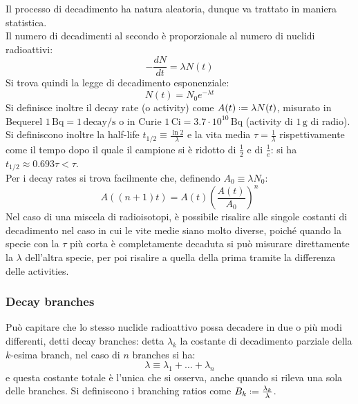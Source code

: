 Il processo di decadimento ha natura aleatoria, dunque va trattato in maniera statistica.\\
Il numero di decadimenti al secondo è proporzionale al numero di nuclidi radioattivi:
\begin{equation}
	- \frac{dN}{dt} = \lambda N(t)
	\label{eq:2.1}
\end{equation}
Si trova quindi la legge di decadimento esponenziale:
\begin{equation}
	N(t) = N_0 e^{-\lambda t}
	\label{eq:2.2}
\end{equation}
Si definisce inoltre il decay rate (o activity) come $ A(t) \defeq \lambda N(t) $, misurato in Bequerel $ 1\,\text{Bq} = 1 \,\text{decay}/\text{s} $ o in Curie $ 1\,\text{Ci} = 3.7\cdot10^{10}\,\text{Bq} $ (activity di $ 1\,\text{g} $ di radio). Si definiscono inoltre la half-life $ t_{1/2} \equiv \frac{\ln 2}{\lambda} $ e la vita media $ \tau = \frac{1}{\lambda} $ rispettivamente come il tempo dopo il quale il campione si è ridotto di $ \frac{1}{2} $ e di $ \frac{1}{e} $: si ha $ t_{1/2} \approx 0.693 \tau < \tau $.\\
Per i decay rates si trova facilmente che, definendo $ A_0 \equiv \lambda N_0 $:
\begin{equation}
	A((n+1)t) = A(t) \left( \frac{A(t)}{A_0} \right)^n
	\label{eq:2.3}
\end{equation}
Nel caso di una miscela di radioisotopi, è possibile risalire alle singole costanti di decadimento nel caso in cui le vite medie siano molto diverse, poiché quando la specie con la $ \tau $ più corta è completamente decaduta si può misurare direttamente la $ \lambda $ dell'altra specie, per poi risalire a quella della prima tramite la differenza delle activities.

\subsubsection{Decay branches}

Può capitare che lo stesso nuclide radioattivo possa decadere in due o più modi differenti, detti decay branches: detta $ \lambda_k $ la costante di decadimento parziale della $ k $-esima branch, nel caso di $ n $ branches si ha:
\begin{equation}
	\lambda \equiv \lambda_1 + \dots + \lambda_n
	\label{eq:2.4}
\end{equation}
e questa costante totale è l'unica che si osserva, anche quando si rileva una sola delle branches. Si definiscono i branching ratios come $ B_k \defeq \frac{\lambda_k}{\lambda} $.

